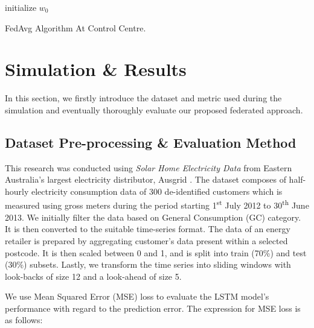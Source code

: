 \documentclass[10pt, conference]{IEEEtran}
\begin{document}
\begin{algorithm}
initialize $w_0$

\caption{FedAvg Algorithm At Control Centre.}
\label{proposedalgofedavg}
\end{algorithm}

\section{Simulation \& Results}
\label{sec:results}
In this section, we firstly introduce the dataset and metric used during the simulation and eventually thoroughly evaluate our proposed federated approach.

\subsection{Dataset Pre-processing \& Evaluation Method}

This research was conducted using \textit{Solar Home Electricity Data} from Eastern Australia's largest electricity distributor, Ausgrid \cite{datasetausgrid}. The dataset composes of half-hourly electricity consumption data of 300 de-identified customers which is measured using gross meters during the period starting 1\textsuperscript{st} July 2012 to 30\textsuperscript{th} June 2013. We initially filter the data based on General Consumption (GC) category. It is then converted to the suitable time-series format. The data of an energy retailer is prepared by aggregating customer's data present within a selected postcode. It is then scaled between 0 and 1, and is split into train (70\%) and test (30\%) subsets. Lastly, we transform the time series into sliding windows with look-backs of size 12 and a look-ahead of size 5.

We use Mean Squared Error (MSE) loss to evaluate the LSTM model's performance with regard to the prediction error. The expression for MSE loss is as follows:
\end{document}
